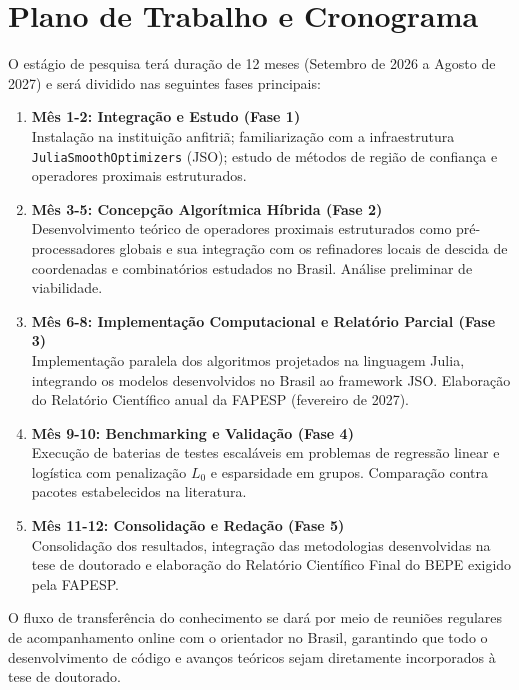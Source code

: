 \section{Plano de Trabalho e Cronograma}

O estágio de pesquisa terá duração de 12 meses (Setembro de 2026 a Agosto de 2027) e será dividido nas seguintes fases principais:

\begin{enumerate}
    \item \textbf{Mês 1-2: Integração e Estudo (Fase 1)} \\
    Instalação na instituição anfitriã; familiarização com a infraestrutura \texttt{JuliaSmoothOptimizers} (JSO); estudo de métodos de região de confiança e operadores proximais estruturados.
    \item \textbf{Mês 3-5: Concepção Algorítmica Híbrida (Fase 2)} \\
    Desenvolvimento teórico de operadores proximais estruturados como pré-processadores globais e sua integração com os refinadores locais de descida de coordenadas e combinatórios estudados no Brasil. Análise preliminar de viabilidade.
    \item \textbf{Mês 6-8: Implementação Computacional e Relatório Parcial (Fase 3)} \\
    Implementação paralela dos algoritmos projetados na linguagem Julia, integrando os modelos desenvolvidos no Brasil ao framework JSO. Elaboração do Relatório Científico anual da FAPESP (fevereiro de 2027).
    \item \textbf{Mês 9-10: Benchmarking e Validação (Fase 4)} \\
    Execução de baterias de testes escaláveis em problemas de regressão linear e logística com penalização $L_0$ e esparsidade em grupos. Comparação contra pacotes estabelecidos na literatura.
    \item \textbf{Mês 11-12: Consolidação e Redação (Fase 5)} \\
    Consolidação dos resultados, integração das metodologias desenvolvidas na tese de doutorado e elaboração do Relatório Científico Final do BEPE exigido pela FAPESP.
\end{enumerate}

O fluxo de transferência do conhecimento se dará por meio de reuniões regulares de acompanhamento online com o orientador no Brasil, garantindo que todo o desenvolvimento de código e avanços teóricos sejam diretamente incorporados à tese de doutorado.
